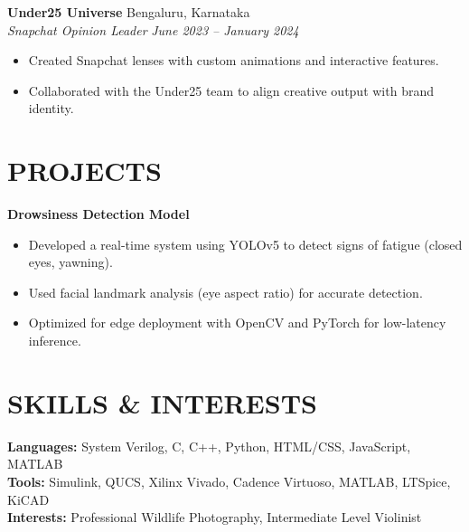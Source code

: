 \documentclass[11pt]{article}
\begin{document}
\textbf{Under25 Universe} \hfill Bengaluru, Karnataka \\
\textit{Snapchat Opinion Leader} \hfill \emph{June 2023 – January 2024}
\begin{itemize}[noitemsep, topsep=0pt]
    \item Created Snapchat lenses with custom animations and interactive features.
    \item Collaborated with the Under25 team to align creative output with brand identity.
\end{itemize}

\section*{PROJECTS}

\textbf{Drowsiness Detection Model}
\begin{itemize}[noitemsep, topsep=0pt]
    \item Developed a real-time system using YOLOv5 to detect signs of fatigue (closed eyes, yawning).
    \item Used facial landmark analysis (eye aspect ratio) for accurate detection.
    \item Optimized for edge deployment with OpenCV and PyTorch for low-latency inference.
\end{itemize}

\section*{SKILLS \& INTERESTS}

\textbf{Languages:} System Verilog, C, C++, Python, HTML/CSS, JavaScript, MATLAB \\
\textbf{Tools:} Simulink, QUCS, Xilinx Vivado, Cadence Virtuoso, MATLAB, LTSpice, KiCAD \\
\textbf{Interests:} Professional Wildlife Photography, Intermediate Level Violinist
\end{document}
